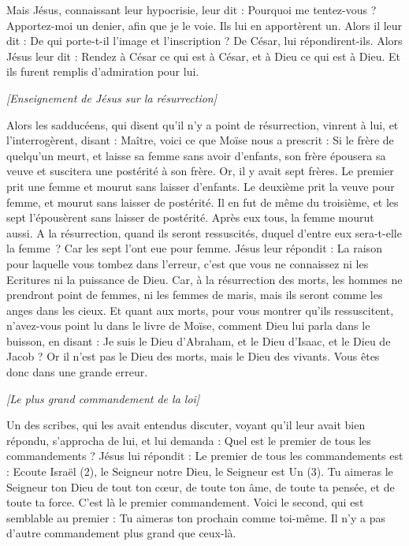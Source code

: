 \begin{multicols}{2}
Mais Jésus, connaissant leur hypocrisie, leur dit : Pourquoi me tentez-vous ? Apportez-moi un denier, afin que je le voie.
Ils lui en apportèrent un. Alors il leur dit : De qui porte-t-il l’image et l’inscription ? De César, lui répondirent-ils.
Alors Jésus leur dit : Rendez à César ce qui est à César, et à Dieu ce qui est à Dieu. Et ils furent remplis d’admiration pour lui.
\begin{center}
\textit{[Enseignement de Jésus sur la résurrection]}
\end{center}
\PPE{}
Alors les sadducéens, qui disent qu'il n'y a point de résurrection, vinrent à lui, et l'interrogèrent, disant :
Maître, voici ce que Moïse nous a prescrit : Si le frère de quelqu'un meurt, et laisse sa femme sans avoir d'enfants, son frère épousera sa veuve et suscitera une postérité à son frère.
Or, il y avait sept frères. Le premier prit une femme et mourut sans laisser d'enfants.
Le deuxième prit la veuve pour femme, et mourut sans laisser de postérité. Il en fut de même du troisième,
et les sept l’épousèrent sans laisser de postérité. Après eux tous, la femme mourut aussi.
A la résurrection, quand ils seront ressuscités, duquel d’entre eux sera-t-elle la femme ? Car les sept l’ont eue pour femme.
Jésus leur répondit : La raison pour laquelle vous tombez dans l'erreur, c'est que vous ne connaissez ni les Ecritures ni la puissance de Dieu.
Car, à la résurrection des morts, les hommes ne prendront point de femmes, ni les femmes de maris, mais ils seront comme les anges dans les cieux.
Et quant aux morts, pour vous montrer qu'ils ressuscitent, n'avez-vous point lu dans le livre de Moïse, comment Dieu lui parla dans le buisson, en disant : Je suis le Dieu d'Abraham, et le Dieu d'Isaac, et le Dieu de Jacob ?
Or il n'est pas le Dieu des morts, mais le Dieu des vivants. Vous êtes donc dans une grande erreur.
\begin{center}
\textit{[Le plus grand commandement de la loi]}
\end{center}
\PPE{}
Un des scribes, qui les avait entendus discuter, voyant qu'il leur avait bien répondu, s'approcha de lui, et lui demanda : Quel est le premier de tous les commandements ?
Jésus lui répondit : Le premier de tous les commandements est : Ecoute Israël (2), le Seigneur notre Dieu, le Seigneur est Un (3).
Tu aimeras le Seigneur ton Dieu de tout ton cœur, de toute ton âme, de toute ta pensée, et de toute ta force. C'est là le premier commandement.
Voici le second, qui est semblable au premier : Tu aimeras ton prochain comme toi-même. Il n'y a pas d'autre commandement plus grand que ceux-là.

\end{multicols}
